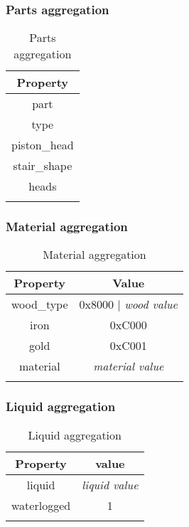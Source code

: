 \subsubsection{Parts aggregation}\label{spigot-types:parts}

\begin{longtable}{ |c| }
\hline
Property \\
\hline
\endhead
part \\
type \\
piston\_head \\
stair\_shape \\
heads \\
\hline
\caption{Parts aggregation}
\end{longtable}

\subsubsection{Material aggregation}\label{spigot-types:material}

\begin{longtable}{ |c|c| }
\hline
Property & Value \\
\hline
\endhead
wood\_type & 0x8000 $|$ \textit{wood value} \\
\hline
iron & 0xC000 \\
gold & 0xC001 \\
\hline
material & \textit{material value} \\
\hline
\caption{Material aggregation}
\end{longtable}

\subsubsection{Liquid aggregation}\label{spigot-types:liquid}

\begin{longtable}{ |c|c| }
\hline
Property & value \\
\hline
\endhead
liquid & \textit{liquid value} \\
waterlogged & 1\footnotemark \\
\hline
\caption{Liquid aggregation}
\end{longtable}


